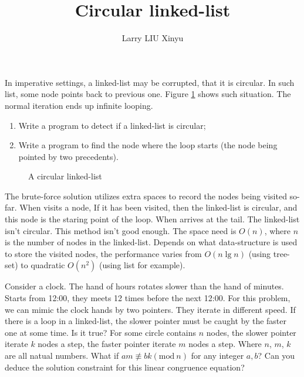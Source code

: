 \documentclass{article}
\begin{document}
\title{Circular linked-list}
\author{Larry LIU Xinyu}
\maketitle

In imperative settings, a linked-list may be corrupted, that it is circular. In such list, some node
points back to previous one. Figure \ref{fig:circular-list} shows such situation.
The normal iteration ends up infinite looping.
  \begin{enumerate}
    \item Write a program to detect if a linked-list is circular;
    \item Write a program to find the node where the loop starts (the node being pointed by two precedents).
  \end{enumerate}

\begin{figure}[htdp]
\centering
{}
\caption{A circular linked-list}
\label{fig:circular-list}
\end{figure}

The brute-force solution utilizes extra spaces to record the nodes being visited so-far.
When visits a node, If it has been visited, then the linked-list is circular, and this
node is the staring point of the loop. When arrives at the tail. The linked-list isn't
circular. This method isn't good enough. The space need is $O(n)$, where $n$ is the
number of nodes in the linked-list. Depends on what data-structure is used to store
the visited nodes, the performance varies from $O(n \lg n)$ (using tree-set) to quadratic $O(n^2)$
(using list for example).

Consider a clock. The hand of hours rotates slower than the hand of minutes. Starts
from 12:00, they meets 12 times before the next 12:00. For this problem,
we can mimic the clock hands by two pointers. They iterate in different speed.
If there is a loop in a linked-list, the slower pointer must be caught by the faster
one at some time. Is it true? For some circle contains $n$ nodes, the
slower pointer iterate $k$ nodes a step, the faster pointer iterate $m$ nodes a step.
Where $n$, $m$, $k$ are all natual numbers. What if $am \not\equiv bk (\textrm{mod}\ n)$ for
any integer $a, b$? Can you deduce the solution constraint for this linear congruence equation?
\end{document}
